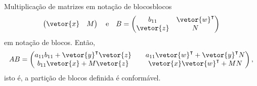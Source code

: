 \begin{lemma}{Multiplicação de matrizes em notação de blocos}{blocos}
\begin{equation*}
\begin{pmatrix}
            \vetor{x} & M
        \end{pmatrix}\quad\text{e}\quad
        B = \begin{pmatrix}
            b_{11} & \vetor{w}^\intercal\\
            \vetor{z} & N
        \end{pmatrix}
    \end{equation*}
    em notação de blocos. Então,
    \begin{equation*}
        A B = \begin{pmatrix}
            a_{11}b_{11} + \vetor{y}^\intercal \vetor{z} && a_{11} \vetor{w}^\intercal + \vetor{y}^\intercal N\\
            b_{11} \vetor{x} + M \vetor{z} && \vetor{x}\vetor{w}^\intercal + MN
        \end{pmatrix},
    \end{equation*}
    isto é, a partição de blocos definida é conformável.
\end{lemma}
